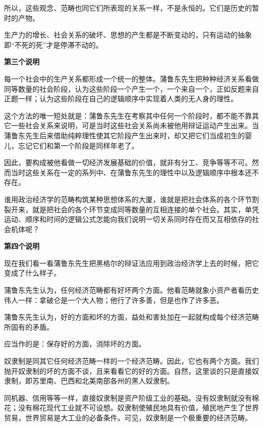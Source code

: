 \documentclass[a4paper,twoside,12pt,AutoFakeBold]{ctexart}
\begin{document}
所以，这些观念、范畴也同它们所表现的关系一样，不是永恒的。它们是历史的暂时的产物。

生产力的增长、社会关系的破坏、思想的产生都是不断变动的，只有运动的抽象即“不死的死”才是停滞不动的。

\begin{center}
    \textbf{第三个说明}
\end{center}

每一个社会中的生产关系都形成一个统一的整体。蒲鲁东先生把种种经济关系看做同等数量的社会阶段，认为这些阶段一个产生一个，一个来自一个，正如反题来自正题一样；认为这些阶段在自己的逻辑顺序中实现着人类的无人身的理性。

这个方法的唯一短处就是：蒲鲁东先生在考察其中任何一个阶段时，都不能不靠其它一些社会关系来说明，可是当时这些社会关系尚未被他用辩证运动产生出来。当蒲鲁东先生后来借助纯粹理性使其它阶段产生出来时，却又把它们当成初生的婴儿，忘记它们和第一个阶段是同样年老了。

因此，要构成被他看做一切经济发展基础的价值，就非有分工、竞争等等不可。然而当时这些关系在一定的系列中、在蒲鲁东先生的理性中以及逻辑顺序中根本还不存在。

谁用政治经济学的范畴构筑某种思想体系的大厦，谁就是把社会体系的各个环节割裂开来，就是把社会的各个环节变成同等数量的互相连接的单个社会。其实，单凭运动、顺序和时间的逻辑公式怎能向我们说明一切关系同时存在而又互相依存的社会机体呢？

\begin{center}
    \textbf{第四个说明}
\end{center}

现在我们看一看蒲鲁东先生把黑格尔的辩证法应用到政治经济学上去的时候，把它变成了什么样子。

蒲鲁东先生认为，任何经济范畴都有好坏两个方面。他看范畴就象小资产者看历史伟人一样：拿破仑是一个大人物；他行了许多善，但是也作了许多恶。

蒲鲁东先生认为，好的方面和坏的方面，益处和害处加在一起就构成每个经济范畴所固有的矛盾。

应当作的是：保存好的方面，消除坏的方面。

奴隶制是同其它任何经济范畴一样的一个经济范畴。因此，它也有两个方面。我们抛开奴隶制的坏的方面不谈，且来看看它的好的方面。自然，这里谈的只是直接奴隶制，即苏里南、巴西和北美南部各州的黑人奴隶制。

同机器、信用等等一样，直接奴隶制是资产阶级工业的基础。没有奴隶制就没有棉花；没有棉花现代工业就不可设想。奴隶制使殖民地具有价值，殖民地产生了世界贸易，世界贸易是大工业的必备条件。可见，奴隶制是一个极重要的经济范畴。
\end{document}
